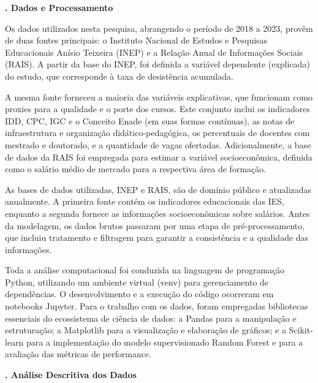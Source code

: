 \vspace{2em}
\noindent\textbf{\themanualchapter. Dados e Processamento}
\vspace{1em}
\par

Os dados utilizados nesta pesquisa, abrangendo o período de 2018 a 2023, provêm de duas fontes principais: o Instituto Nacional de Estudos e Pesquisas Educacionais Anísio Teixeira (INEP) e a Relação Anual de Informações Sociais (RAIS). A partir da base do INEP, foi definida a variável dependente (explicada) do estudo, que corresponde à taxa de desistência acumulada.

A mesma fonte forneceu a maioria das variáveis explicativas, que funcionam como proxies para a qualidade e o porte dos cursos. Este conjunto inclui os indicadores IDD, CPC, IGC e o Conceito Enade (em suas formas contínuas), as notas de infraestrutura e organização didático-pedagógica, os percentuais de docentes com mestrado e doutorado, e a quantidade de vagas ofertadas. Adicionalmente, a base de dados da RAIS foi empregada para estimar a variável socioeconômica, definida como o salário médio de mercado para a respectiva área de formação.

As bases de dados utilizadas, INEP e RAIS, são de domínio público e atualizadas anualmente. A primeira fonte contém os indicadores educacionais das IES, enquanto a segunda fornece as informações socioeconômicas sobre salários. Antes da modelagem, os dados brutos passaram por uma etapa de pré-processamento, que incluiu tratamento e filtragem para garantir a consistência e a qualidade das informações.

Toda a análise computacional foi conduzida na linguagem de programação Python, utilizando um ambiente virtual (venv) para gerenciamento de dependências. O desenvolvimento e a execução do código ocorreram em notebooks Jupyter. Para o trabalho com os dados, foram empregadas bibliotecas essenciais do ecossistema de ciência de dados: a Pandas para a manipulação e estruturação; a Matplotlib para a visualização e elaboração de gráficos; e a Scikit-learn para a implementação do modelo supervisionado Random Forest e para a avaliação das métricas de performance.

\newpage

\vspace{2em}
\noindent\textbf{\themanualchapter. Análise Descritiva dos Dados}
\vspace{1em}
\par

